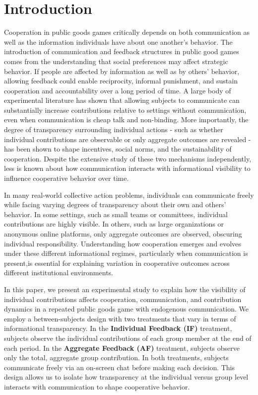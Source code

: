 \documentclass[12pt,letterpaper,english]{article}
\begin{document}
\section{Introduction}
Cooperation in public goods games critically depends on both communication as well as the information individuals have about one another’s behavior. The introduction of communication and feedback structures in public good games comes from the understanding that social preferences may affect strategic behavior. If people are affected by information as well as by others' behavior, allowing feedback could enable reciprocity, informal punishment, and sustain cooperation and accountability over a long period of time. A large body of experimental literature has shown that allowing subjects to communicate can substantially increase contributions relative to settings without communication, even when communication is cheap talk and non-binding. More importantly, the degree of transparency surrounding individual actions - such as whether individual contributions are observable or only aggregate outcomes are revealed - has been shown to shape incentives, social norms, and the sustainability of cooperation. Despite the extensive study of these two mechanisms independently, less is known about how communication interacts with informational visibility to influence cooperative behavior over time.

In many real-world collective action problems, individuals can communicate freely while facing varying degrees of transparency about their own and others' behavior. In some settings, such as small teams or committees, individual contributions are highly visible. In others, such as large organizations or anonymous online platforms, only aggregate outcomes are observed, obscuring individual responsibility. Understanding how cooperation emerges and evolves under these different informational regimes, particularly when communication is present,is essential for explaining variation in cooperative outcomes across different institutional environments.

In this paper, we present an experimental study to explain how the visibility of individual contributions affects cooperation, communication, and contribution dynamics in a repeated public goods game with endogenous communication. We employ a between-subjects design with two treatments that vary in terms of informational transparency. In the \textbf{Individual Feedback (IF)} treatment, subjects observe the individual contributions of each group member at the end of each period. In the \textbf{Aggregate Feedback (AF)} treatment, subjects observe only the total, aggregate group contribution. In both treatments, subjects communicate freely via an on-screen chat before making each decision. This design allows us to isolate how transparency at the individual versus group level interacts with communication to shape cooperative behavior.
\end{document}
